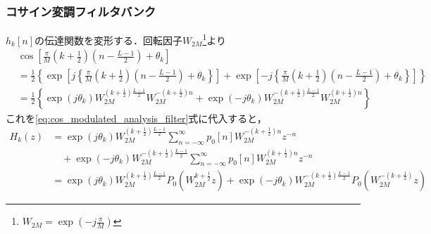 \documentclass[14pt,xcolor=dvipsnames,table,dvipdfmx]{beamer}
\begin{document}
\begin{frame}[c]
    \frametitle{コサイン変調フィルタバンク}
    $h_{k}[n]$の伝達関数を変形する．回転因子$W_{2M}$\footnote{$W_{2M} = \exp\left(-j\frac{\pi}{M}\right)$}より
    \scriptsize
    \begin{align*}
        &\cos\left[ \frac{\pi}{M} \left( k + \frac{1}{2} \right) \left( n - \frac{L - 1}{2} \right) + \theta_{k} \right] \\
        &= \frac{1}{2} \left\{ \exp\left[ j \left\{ \frac{\pi}{M} \left( k + \frac{1}{2} \right) \left( n - \frac{L - 1}{2} \right) + \theta_{k} \right\} \right] + \exp\left[-j \left\{ \frac{\pi}{M} \left( k + \frac{1}{2} \right) \left( n - \frac{L - 1}{2} \right) + \theta_{k} \right\} \right] \right\} \\
        &= \frac{1}{2} \left\{ \exp(j\theta_{k}) W_{2M}^{\left( k + \frac{1}{2} \right)\frac{L-1}{2}}W_{2M}^{-\left( k + \frac{1}{2} \right)n} + \exp(-j\theta_{k}) W_{2M}^{-\left( k + \frac{1}{2} \right)\frac{L-1}{2}} W_{2M}^{\left( k + \frac{1}{2} \right)n} \right\}
    \end{align*}
    \normalsize
    これを\eqref{eq:cos_modulated_analysis_filter}式に代入すると，
    \scriptsize
    \begin{align*}
        H_{k}(z) &= \exp(j\theta_{k}) W_{2M}^{\left( k + \frac{1}{2} \right)\frac{L-1}{2}} \sum_{n = -\infty}^{\infty} p_{0}[n] W_{2M}^{-\left(k + \frac{1}{2} \right)n} z^{-n} \\
        &\quad + \exp(-j\theta_{k}) W_{2M}^{-\left( k + \frac{1}{2} \right)\frac{L-1}{2}} \sum_{n = -\infty}^{\infty} p_{0}[n] W_{2M}^{\left(k + \frac{1}{2} \right)n} z^{-n} \\
        &= \exp(j\theta_{k}) W_{2M}^{\left( k + \frac{1}{2} \right)\frac{L-1}{2}} P_{0}\left(W_{2M}^{k + \frac{1}{2}} z \right) + \exp(-j\theta_{k}) W_{2M}^{-\left( k + \frac{1}{2} \right)\frac{L-1}{2}} P_{0}\left(W_{2M}^{-\left(k + \frac{1}{2}\right)} z \right)
    \end{align*}
\end{frame}
\end{document}
